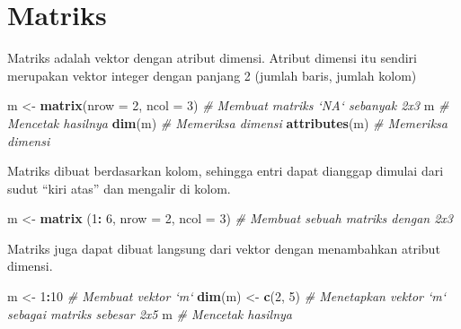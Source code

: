 \documentclass[
]{book}
\newenvironment{Shaded}{\begin{snugshade}}{\end{snugshade}}
\newcommand{\CommentTok}[1]{\textcolor[rgb]{0.56,0.35,0.01}{\textit{#1}}}
\newcommand{\DataTypeTok}[1]{\textcolor[rgb]{0.13,0.29,0.53}{#1}}
\newcommand{\DecValTok}[1]{\textcolor[rgb]{0.00,0.00,0.81}{#1}}
\newcommand{\KeywordTok}[1]{\textcolor[rgb]{0.13,0.29,0.53}{\textbf{#1}}}
\newcommand{\NormalTok}[1]{#1}
\newcommand{\OperatorTok}[1]{\textcolor[rgb]{0.81,0.36,0.00}{\textbf{#1}}}
\newcommand{\StringTok}[1]{\textcolor[rgb]{0.31,0.60,0.02}{#1}}
\begin{document}
\hypertarget{matriks}{%
\section{Matriks}\label{matriks}}

Matriks adalah vektor dengan atribut dimensi. Atribut dimensi itu sendiri merupakan vektor integer dengan panjang 2 (jumlah baris, jumlah kolom)

\begin{Shaded}
\begin{Highlighting}[]
\NormalTok{m <-}\StringTok{ }\KeywordTok{matrix}\NormalTok{(}\DataTypeTok{nrow =} \DecValTok{2}\NormalTok{, }\DataTypeTok{ncol =} \DecValTok{3}\NormalTok{)          }\CommentTok{# Membuat matriks `NA` sebanyak 2x3}
\NormalTok{m                                        }\CommentTok{# Mencetak hasilnya}
\KeywordTok{dim}\NormalTok{(m)                                   }\CommentTok{# Memeriksa dimensi}
\KeywordTok{attributes}\NormalTok{(m)                            }\CommentTok{# Memeriksa dimensi}
\end{Highlighting}
\end{Shaded}

Matriks dibuat berdasarkan kolom, sehingga entri dapat dianggap dimulai dari sudut ``kiri atas'' dan mengalir di kolom.

\begin{Shaded}
\begin{Highlighting}[]
\NormalTok{m <-}\StringTok{ }\KeywordTok{matrix}\NormalTok{ (}\DecValTok{1}\OperatorTok{:}\StringTok{ }\DecValTok{6}\NormalTok{, }\DataTypeTok{nrow =} \DecValTok{2}\NormalTok{, }\DataTypeTok{ncol =} \DecValTok{3}\NormalTok{)   }\CommentTok{# Membuat sebuah matriks dengan 2x3}
\end{Highlighting}
\end{Shaded}

Matriks juga dapat dibuat langsung dari vektor dengan menambahkan atribut dimensi.

\begin{Shaded}
\begin{Highlighting}[]
\NormalTok{m <-}\StringTok{ }\DecValTok{1}\OperatorTok{:}\DecValTok{10}                                \CommentTok{# Membuat vektor `m`}
\KeywordTok{dim}\NormalTok{(m) <-}\StringTok{ }\KeywordTok{c}\NormalTok{(}\DecValTok{2}\NormalTok{, }\DecValTok{5}\NormalTok{)                        }\CommentTok{# Menetapkan vektor `m` sebagai matriks sebesar 2x5}
\NormalTok{m                                        }\CommentTok{# Mencetak hasilnya}
\end{Highlighting}
\end{Shaded}
\end{document}
